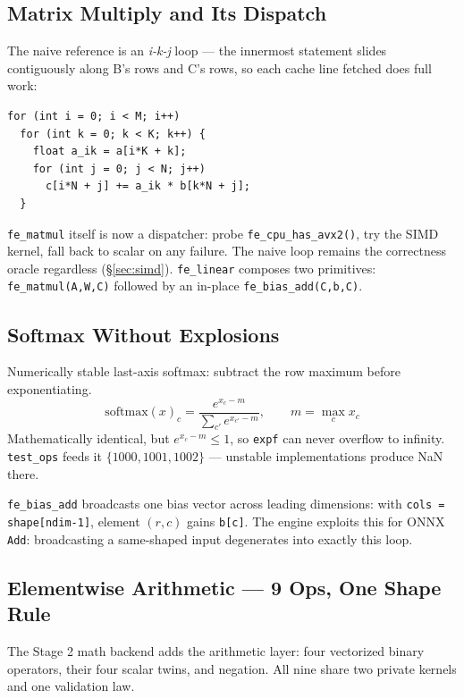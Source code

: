 \documentclass[11pt,a4paper]{article}
\begin{document}
\subsection{Matrix Multiply and Its Dispatch}

The naive reference is an \emph{i-k-j} loop --- the innermost statement slides
contiguously along B's rows and C's rows, so each cache line fetched does full
work:

\begin{lstlisting}[style=cstyle]
for (int i = 0; i < M; i++)
  for (int k = 0; k < K; k++) {
    float a_ik = a[i*K + k];
    for (int j = 0; j < N; j++)
      c[i*N + j] += a_ik * b[k*N + j];
  }
\end{lstlisting}

\texttt{fe\_matmul} itself is now a dispatcher: probe \texttt{fe\_cpu\_has\_avx2()},
try the SIMD kernel, fall back to scalar on any failure. The naive loop remains
the correctness oracle regardless (\S\ref{sec:simd}). \texttt{fe\_linear} composes
two primitives: \texttt{fe\_matmul(A,W,C)} followed by an in-place
\texttt{fe\_bias\_add(C,b,C)}.

\subsection{Softmax Without Explosions}

Numerically stable last-axis softmax: subtract the row maximum before
exponentiating.
\[
\mathrm{softmax}(x)_c = \frac{e^{x_c - m}}{\sum_{c'} e^{x_{c'} - m}},
\qquad m = \max_c x_c
\]
Mathematically identical, but $e^{x_c-m} \le 1$, so \texttt{expf} can never
overflow to infinity. \texttt{test\_ops} feeds it $\{1000, 1001, 1002\}$ ---
unstable implementations produce NaN there.

\texttt{fe\_bias\_add} broadcasts one bias vector across leading dimensions:
with \texttt{cols = shape[ndim-1]}, element $(r, c)$ gains \texttt{b[c]}. The
engine exploits this for ONNX \texttt{Add}: broadcasting a same-shaped input
degenerates into exactly this loop.


\subsection{Elementwise Arithmetic --- 9 Ops, One Shape Rule}

The Stage 2 math backend adds the arithmetic layer: four vectorized binary
operators, their four scalar twins, and negation. All nine share two private
kernels and one validation law.
\end{document}
